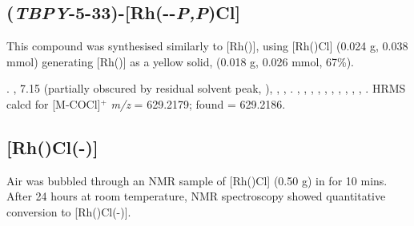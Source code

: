 
\subsection*{(\emph{TBPY}-5-33)-[Rh(\tButhixantphos--\emph{P,P}\textprime)Cl]}


This compound was synthesised similarly to [Rh(\tBusixantphos)], using [Rh(\tBuxantphos)Cl] (0.024 g, 0.038 mmol) generating [Rh(\tBuxantphos)] as a yellow solid, (0.018 g, 0.026 mmol, 67\%).  

.
,
7.15 (partially obscured by residual solvent peak, \CtBuaH),
,
,
.
,
,
,
,
,
,
,
,
,
,
.
HRMS calcd for  [M-COCl]$^+$ \emph{m/z} = 629.2179; found = 629.2186.



\subsection*{\texorpdfstring{[Rh(\tBusixantphos)Cl(-)]} R}


Air was bubbled through an NMR sample of [Rh(\tBusixantphos)Cl] (0.50 g) in  for 10 mins.  After 24 hours at room temperature, NMR spectroscopy showed quantitative conversion to [Rh(\tBusixantphos)Cl(-)].

